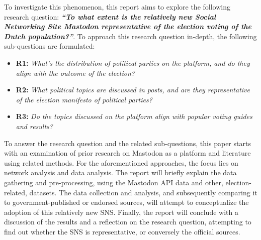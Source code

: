 To investigate this phenomenon, this report aims to explore the following research question:
\textbf{\textit{“To what extent is the relatively new Social Networking Site Mastodon representative of the election voting  of the Dutch population?”}}.
To approach this research question in-depth, the following sub-questions are formulated:
\begin{itemize}
  \item \textbf{R1:} \textit{What's the distribution of political parties on the platform, and do they align with the outcome of the election? }
  \item \textbf{R2:} \textit{What political topics are discussed in posts, and are they representative of the election manifesto of political parties? }
  \item \textbf{R3:} \textit{Do the topics discussed on the platform align with popular voting guides and results?}
\end{itemize}

To answer the research question and the related sub-questions, this paper starts with an examination of prior research on Mastodon as a platform and literature using related methods.
For the aforementioned approaches, the focus lies on network analysis and data analysis.
The report will briefly explain the data gathering and pre-processing, using the Mastodon API data and other, election-related, datasets.
The data collection and analysis, and subsequently comparing it to government-published or endorsed sources, will attempt to conceptualize the adoption of this relatively new SNS.
Finally, the report will conclude with a discussion of the results and a reflection on the research question, attempting to find out whether the SNS is representative, or conversely the official sources.